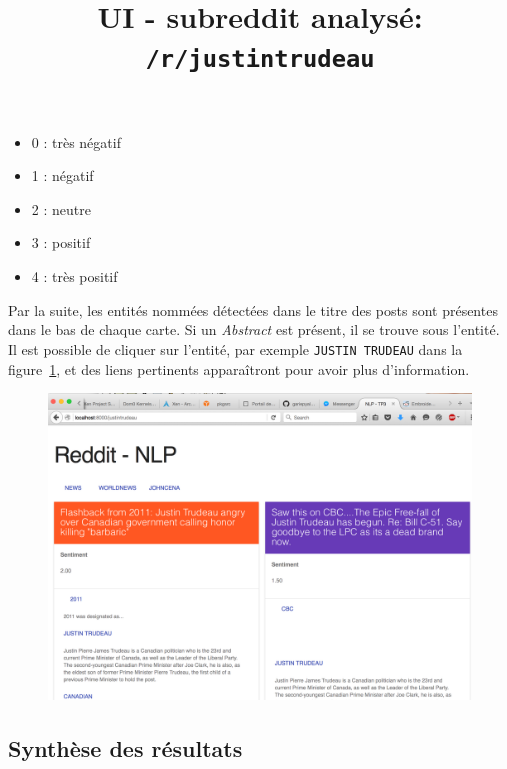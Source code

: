 \documentclass[12pt]{article}
\begin{document}
\begin{itemize}
\item 0 : très négatif
\item 1 : négatif
\item 2 : neutre
\item 3 : positif
\item 4 : très positif
\\
\end{itemize}

Par la suite, les entités nommées détectées dans le titre des posts sont présentes dans le bas de chaque carte. Si un \textit{Abstract} est présent, il se trouve sous l'entité. Il est possible de cliquer sur l'entité, par exemple \verb;JUSTIN TRUDEAU; dans la figure~\ref{fig:ui-example}, et des liens pertinents apparaîtront pour avoir plus d'information.

\begin{figure}[H]
  \begin{center}
    \title{UI - subreddit analysé: \verb;/r/justintrudeau;}
  \end{center}
  \includegraphics[width=18cm]{fig/ui-example.png}
  \label{fig:ui-example}
\end{figure}

\subsection{Synthèse des résultats}
\end{document}
